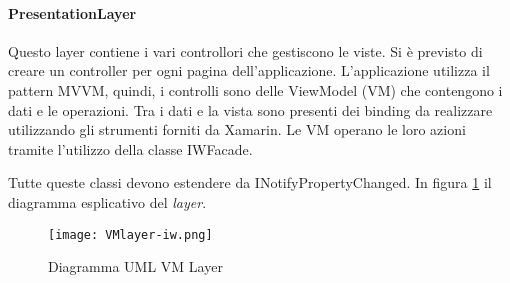 \begin{namespacedesc}
\end{namespacedesc}



\paragraph{PresentationLayer} %
Questo layer contiene i vari controllori che gestiscono le viste. Si è previsto di creare un controller per ogni pagina dell’applicazione. L’applicazione utilizza il pattern MVVM, quindi, i controlli sono delle ViewModel (VM) che contengono i dati e le operazioni. Tra i dati e la vista sono presenti dei binding da realizzare utilizzando gli strumenti forniti da Xamarin. Le VM operano le loro azioni tramite l’utilizzo della classe IWFacade. 


Tutte queste classi devono estendere da INotifyPropertyChanged.
In figura \ref{fig:vm-layer-iw} il diagramma esplicativo del \emph{layer}.

\begin{figure}[htbp]
    \centering
    \texttt{[image: VMlayer-iw.png]} 
    \caption{Diagramma UML VM Layer}
    \label{fig:vm-layer-iw} 
\end{figure}

